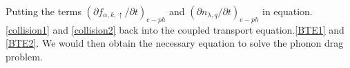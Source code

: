 \documentclass{article}
\newcommand{\pfrac}[2]{\frac{\partial #1}{\partial #2}}
\newcommand{\fak}{f_{\alpha,k,\uparrow}}
\newcommand{\fbk}{f_{\beta,k',\uparrow}}
\newcommand{\nlq}{n_{\lambda,q}}
\begin{document}
Putting the terms $\left(\partial\fak / \partial t\right)_{e-ph}$ and $\left(\partial\nlq / \partial t\right)_{e-ph}$ in 
equation.\ref{collision1} and \ref{collision2} 
back into the coupled transport equation.\ref{BTE1} and \ref{BTE2}. We would then obtain the necessary equation 
to solve the phonon drag problem.



%
%
\end{document}
